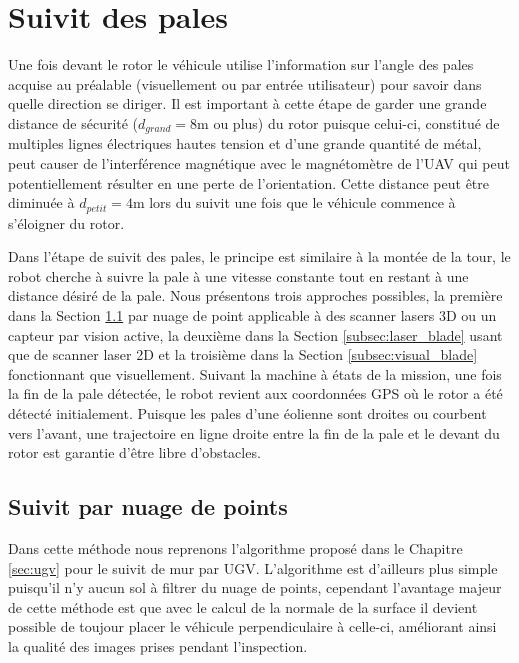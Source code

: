 \section{Suivit des pales}

Une fois devant le rotor le véhicule utilise l'information sur l'angle des pales acquise au préalable (visuellement ou par entrée utilisateur) pour savoir dans quelle direction se diriger. Il est important à cette étape de garder une grande distance de sécurité ($d_{grand} = 8$m ou plus) du rotor puisque celui-ci, constitué de multiples lignes électriques hautes tension et d'une grande quantité de métal, peut causer de l'interférence magnétique avec le magnétomètre de l'UAV qui peut potentiellement résulter en une perte de l'orientation. Cette distance peut être diminuée à $d_{petit} = 4$m lors du suivit une fois que le véhicule commence à s'éloigner du rotor.

Dans l'étape de suivit des pales, le principe est similaire à la montée de la tour, le robot cherche à suivre la pale à une vitesse constante tout en restant à une distance désiré de la pale. Nous présentons trois approches possibles, la première dans la Section \ref{subsec:pcl_blade} par nuage de point applicable à des scanner lasers 3D ou un capteur par vision active, la deuxième dans la Section \ref{subsec:laser_blade} usant que de scanner laser 2D et la troisième dans la Section \ref{subsec:visual_blade} fonctionnant que visuellement. Suivant la machine à états de la mission, une fois la fin de la pale détectée, le robot revient aux coordonnées GPS où le rotor a été détecté initialement. Puisque les pales d'une éolienne sont droites ou courbent vers l'avant, une trajectoire en ligne droite entre la fin de la pale et le devant du rotor est garantie d'être libre d'obstacles.

\subsection{Suivit par nuage de points}
\label{subsec:pcl_blade}

Dans cette méthode nous reprenons l'algorithme proposé dans le Chapitre \ref{sec:ugv} pour le suivit de mur par UGV. L'algorithme est d'ailleurs plus simple puisqu'il n'y aucun sol à filtrer du nuage de points, cependant l'avantage majeur de cette méthode est que avec le calcul de la normale de la surface il devient possible de toujour placer le véhicule perpendiculaire à celle-ci, améliorant ainsi la qualité des images prises pendant l'inspection.

